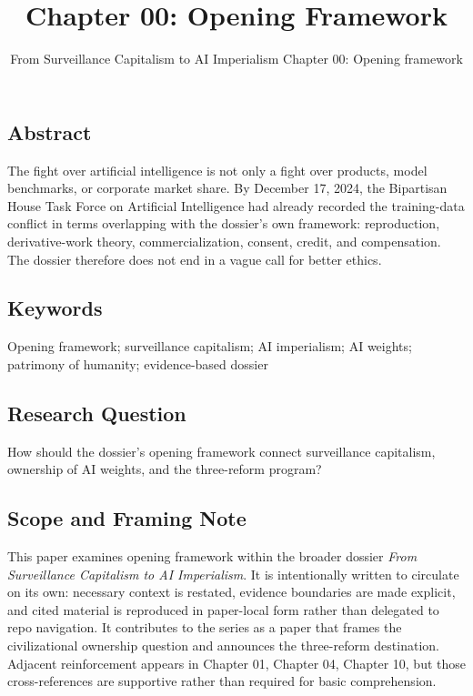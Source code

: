 \documentclass[
  american,
  11pt,
  letterpaper,
]{article}
\title{Chapter 00: Opening Framework}
\subtitle{From Surveillance Capitalism to AI Imperialism \textbar{}
Chapter 00: Opening framework}
\author{}
\date{}
\begin{document}
\maketitle

\subsection{Abstract}\label{abstract}

The fight over artificial intelligence is not only a fight over
products, model benchmarks, or corporate market share. By December 17,
2024, the Bipartisan House Task Force on Artificial Intelligence had
already recorded the training-data conflict in terms overlapping with
the dossier's own framework: reproduction, derivative-work theory,
commercialization, consent, credit, and compensation. The dossier
therefore does not end in a vague call for better ethics.

\subsection{Keywords}\label{keywords}

Opening framework; surveillance capitalism; AI imperialism; AI weights;
patrimony of humanity; evidence-based dossier

\subsection{Research Question}\label{research-question}

How should the dossier's opening framework connect surveillance
capitalism, ownership of AI weights, and the three-reform program?

\subsection{Scope and Framing Note}\label{scope-and-framing-note}

This paper examines opening framework within the broader dossier
\emph{From Surveillance Capitalism to AI Imperialism}. It is
intentionally written to circulate on its own: necessary context is
restated, evidence boundaries are made explicit, and cited material is
reproduced in paper-local form rather than delegated to repo navigation.
It contributes to the series as a paper that frames the civilizational
ownership question and announces the three-reform destination. Adjacent
reinforcement appears in Chapter 01, Chapter 04, Chapter 10, but those
cross-references are supportive rather than required for basic
comprehension.
\end{document}
